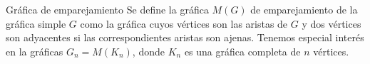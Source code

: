\documentclass[final,xcolor=svgnames]{beamer}
\DeclareMathOperator{\sgn}{sgn}
\begin{document}
\begin{frame}{}
\begin{columns}
\begin{column}{0.5\textwidth}
        
      \begin{block}{Gráfica de emparejamiento}
        Se define la \alert{gráfica $M(G)$ de emparejamiento} de la gráfica
        simple $G$ como la gráfica cuyos vértices son las aristas de
        $G$ y dos vértices son adyacentes si las correspondientes
        aristas son ajenas. Tenemos especial interés en la gráficas
        $G_{n}=M(K_{n})$, donde $K_{n}$ es una gráfica completa de $n$ vértices.
      \end{block}



\end{column}
\end{columns}
\end{frame}
\end{document}
